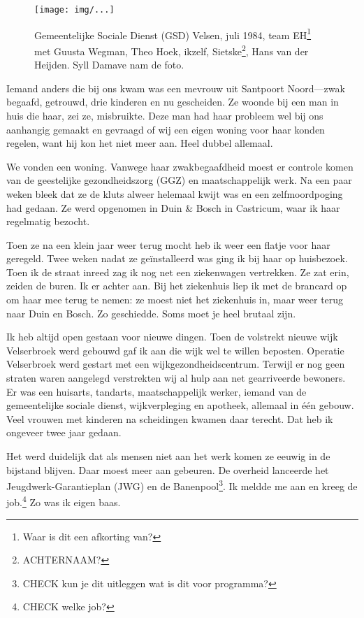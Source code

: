 \documentclass[10pt,twoside,openright]{memoir}
\begin{document}

\begin{figure}[t]
\texttt{[image: img/...]}
\caption{Gemeentelijke Sociale Dienst (GSD) Velsen, juli 1984, team EH\footnote{Waar is dit een afkorting van?} met Guusta Wegman, Theo Hoek, ikzelf, Sietske\footnote{ACHTERNAAM?}, Hans van der Heijden. Syll Damave nam de foto.}
\end{figure}

Iemand anders die bij ons kwam was een mevrouw uit Santpoort Noord---zwak begaafd, getrouwd, drie kinderen en nu gescheiden. Ze woonde bij een man in huis die haar, zei ze, misbruikte. Deze man had haar probleem wel bij ons aanhangig gemaakt en gevraagd of wij een eigen woning voor haar konden regelen, want hij kon het niet meer aan. Heel dubbel allemaal. 

We vonden een woning. Vanwege haar zwakbegaafdheid moest er controle komen van de geestelijke gezondheidszorg (GGZ) en maatschappelijk werk. Na een paar weken bleek dat ze de kluts alweer helemaal kwijt was en een zelfmoordpoging had gedaan. Ze werd opgenomen in Duin \& Bosch in Castricum, waar ik haar regelmatig bezocht. 

Toen ze na een klein jaar weer terug mocht heb ik weer een flatje voor haar geregeld. Twee weken nadat ze geïnstalleerd was ging ik bij haar op huisbezoek. Toen ik de straat inreed zag ik nog net een ziekenwagen vertrekken. Ze zat erin, zeiden de buren. Ik er achter aan. Bij het ziekenhuis liep ik met de brancard op om haar mee terug te nemen: ze moest niet het ziekenhuis in, maar weer terug naar Duin en Bosch. Zo geschiedde. Soms moet je heel brutaal zijn.

Ik heb altijd open gestaan voor nieuwe dingen. Toen de volstrekt nieuwe wijk Velserbroek werd gebouwd gaf ik aan die wijk wel te willen beposten. Operatie Velserbroek werd gestart met een wijkgezondheidscentrum. Terwijl er nog geen straten waren aangelegd verstrekten wij al hulp aan net gearriveerde bewoners. Er was een huisarts, tandarts, maatschappelijk werker, iemand van de gemeentelijke sociale dienst, wijkverpleging en apotheek, allemaal in één gebouw. Veel vrouwen met kinderen na scheidingen kwamen daar terecht. Dat heb ik ongeveer twee jaar gedaan. 

Het werd duidelijk dat als mensen niet aan het werk komen ze eeuwig in de bijstand blijven. Daar moest meer aan gebeuren. De overheid lanceerde het Jeugdwerk-Garantieplan (JWG) en de Banenpool\footnote{CHECK kun je dit uitleggen wat is dit voor programma?}. Ik meldde me aan en kreeg de job.\footnote{CHECK welke job?} Zo was ik eigen baas. 
\end{document}
